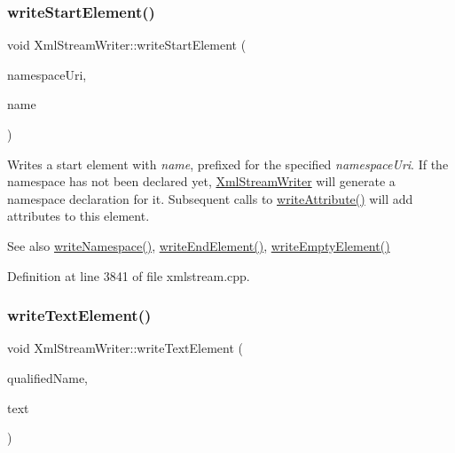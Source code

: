 \subsubsection{\texorpdfstring{write\+Start\+Element()}{writeStartElement()}\hspace{0.1cm}{\footnotesize\ttfamily [2/2]}}
{\footnotesize\ttfamily void Xml\+Stream\+Writer\+::write\+Start\+Element (\begin{DoxyParamCaption}\item[{const Q\+String \&}]{namespace\+Uri,  }\item[{const Q\+String \&}]{name }\end{DoxyParamCaption})}

Writes a start element with {\itshape name}, prefixed for the specified {\itshape namespace\+Uri}. If the namespace has not been declared yet, \hyperlink{class_xml_stream_writer}{Xml\+Stream\+Writer} will generate a namespace declaration for it. Subsequent calls to \hyperlink{class_xml_stream_writer_a685d12dc71870e20e835085b6326787b}{write\+Attribute()} will add attributes to this element.

\begin{DoxySeeAlso}{See also}
\hyperlink{class_xml_stream_writer_ae04b7c7035435fd98cc625257776e732}{write\+Namespace()}, \hyperlink{class_xml_stream_writer_add89e8f61a141e2b320cf2b567e7edfb}{write\+End\+Element()}, \hyperlink{class_xml_stream_writer_a07e058f896327e9236e7c19132842cf2}{write\+Empty\+Element()} 
\end{DoxySeeAlso}


Definition at line 3841 of file xmlstream.\+cpp.

\mbox{\label{class_xml_stream_writer_a3c1e28db26255b0a88745ac76e84485e}} 
\subsubsection{\texorpdfstring{write\+Text\+Element()}{writeTextElement()}\hspace{0.1cm}{\footnotesize\ttfamily [1/2]}}
{\footnotesize\ttfamily void Xml\+Stream\+Writer\+::write\+Text\+Element (\begin{DoxyParamCaption}\item[{const Q\+String \&}]{qualified\+Name,  }\item[{const Q\+String \&}]{text }\end{DoxyParamCaption})}

